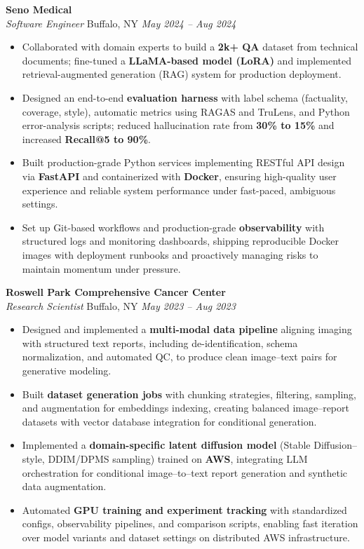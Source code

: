 \vspace*{-1pt}
\item \textbf{Seno Medical}\\
\textit{Software Engineer} \hfill Buffalo, NY \quad \textit{May 2024 -- Aug 2024}
\vspace*{-3pt}
\begin{itemize}[leftmargin=0.2in, topsep=1pt]
  \item Collaborated with domain experts to build a \textbf{2k+ QA} dataset from technical documents; fine-tuned a \textbf{LLaMA-based model (LoRA)} and implemented retrieval-augmented generation (RAG) system for production deployment.
  \item Designed an end-to-end \textbf{evaluation harness} with label schema (factuality, coverage, style), automatic metrics using RAGAS and TruLens, and Python error-analysis scripts; reduced hallucination rate from \textbf{30\% to 15\%} and increased \textbf{Recall@5 to 90\%}.
  \item Built production-grade Python services implementing RESTful API design via \textbf{FastAPI} and containerized with \textbf{Docker}, ensuring high-quality user experience and reliable system performance under fast-paced, ambiguous settings.
  \item Set up Git-based workflows and production-grade \textbf{observability} with structured logs and monitoring dashboards, shipping reproducible Docker images with deployment runbooks and proactively managing risks to maintain momentum under pressure.
\end{itemize}

\vspace*{-1pt}
\item \textbf{Roswell Park Comprehensive Cancer Center}\\
\textit{Research Scientist} \hfill Buffalo, NY \quad \textit{May 2023 -- Aug 2023}
\vspace*{-3pt}
\begin{itemize}[leftmargin=0.2in, topsep=1pt]
  \item Designed and implemented a \textbf{multi-modal data pipeline} aligning imaging with structured text reports, including de-identification, schema normalization, and automated QC, to produce clean image–text pairs for generative modeling.
  \item Built \textbf{dataset generation jobs} with chunking strategies, filtering, sampling, and augmentation for embeddings indexing, creating balanced image–report datasets with vector database integration for conditional generation.
  \item Implemented a \textbf{domain-specific latent diffusion model} (Stable Diffusion–style, DDIM/DPMS sampling) trained on \textbf{AWS}, integrating LLM orchestration for conditional image–to–text report generation and synthetic data augmentation.
  \item Automated \textbf{GPU training and experiment tracking} with standardized configs, observability pipelines, and comparison scripts, enabling fast iteration over model variants and dataset settings on distributed AWS infrastructure.
\end{itemize}
